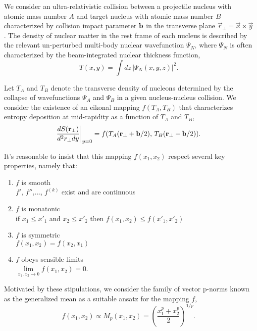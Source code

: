 \documentclass[aps,prl,reprint,amsmath,nofootinbib]{revtex4-1}
\begin{document}
We consider an ultra-relativistic collision between a projectile nucleus with atomic mass number $A$ and
target nucleus with atomic mass number $B$ characterized by collision impact parameter ${\bf b}$ in the
transverse plane $\vec{r}_\perp = \vec{x} \times \vec{y}$. The density of nuclear matter in the rest frame of
each nucleus is described by the relevant un-perturbed multi-body nuclear wavefunction $\Psi_N$, where
$\Psi_N$ is often characterized by the beam-integrated nuclear thickness function,
\begin{equation}
  T(x,y) = \int dz\, \left|\Psi_N(x,y,z) \right|^2.
\end{equation}

Let $T_A$ and $T_B$ denote the transverse density of nucleons determined by the collapse of wavefunctions
$\Psi_A$ and $\Psi_B$ in a given nucleus-nucleus collision. We consider the existence of an eikonal mapping
$f(T_A,T_B)$ that characterizes entropy deposition at mid-rapidity as a function of $T_A$ and $T_B$,
\begin{equation}
  \label{ansatz}
  \frac{dS({\bf r}_\perp)}{d^2r_\perp dy} \biggr \rvert_{y=0} =
  f(T_A({\bf r}_\perp + {\bf b}/2),\,T_B({\bf r}_\perp - {\bf b}/2)).
\end{equation}

It's reasonable to insist that this mapping $f(x_1,x_2)$ respect several key properties, namely that:
\begin{enumerate}
  \item{$f$ is smooth} \\
    $f'$, $f''$,..., $f^{(k)}$ exist and are continuous
  \item{$f$ is monatonic} \\
    if $x_1 \le x'_1$ and $x_2 \le x'_2$ then $f(x_1,x_2) \le f(x'_1,x'_2)$
  \item{$f$ is symmetric} \\
    $f(x_1,x_2) = f(x_2,x_1)$
  \item{$f$ obeys sensible limits} \\
    $\lim\limits_{x_1,x_2 \to 0} f(x_1,x_2) = 0$.
\end{enumerate}
Motivated by these stipulations, we consider the family of vector p-norms known as the generalized mean as a
suitable ansatz for the mapping $f$,
\begin{equation}
  \label{generalized mean ansatz}
  f(x_1, x_2) \propto M_p(x_1,x_2) = \left( \frac{x_1^p + x_2^p}{2} \right)^{1/p}.
\end{equation}
\end{document}
